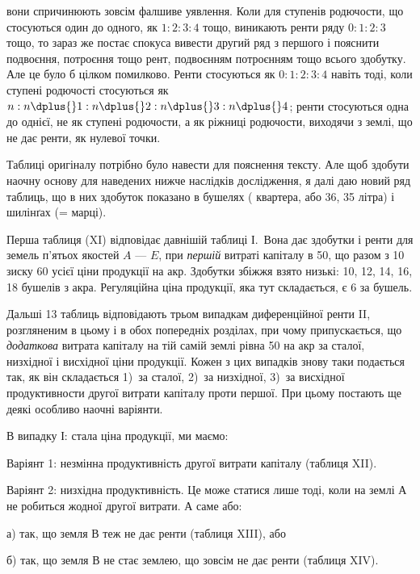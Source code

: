 \parcont{}  %
вони спричинюють зовсім фалшиве уявлення. Коли для ступенів родючости, що
стосуються один до одного, як $1: 2 : 3 : 4$ тощо, виникають ренти ряду $0 : 1 : 2 : 3$
тощо, то зараз же постає спокуса вивести другий ряд з першого і пояснити
подвоєння, потроєння тощо рент, подвоєнням потроєнням тощо всього здобутку.
Але це було б цілком помилково. Ренти стосуються як $0 : 1 : 2 : 3 : 4$ навіть
тоді, коли ступені родючості стосуються як $n : n \dplus{} 1 : n \dplus{} 2 : n \dplus{} 3 : n \dplus{} 4$;
ренти стосуються одна до однієї, не як ступені родючости, а як ріжниці родючости,
виходячи з землі, що не дає ренти, як нулевої точки.

Таблиці оригіналу потрібно було навести для пояснення тексту. Але щоб
здобути наочну основу для наведених нижче наслідків дослідження, я далі
даю новий ряд таблиць, що в них здобуток показано в бушелях (  квартера,
або 36, 35 літра) і шилінґах (= марці).

Перша таблиця (XI) відповідає давнішій таблиці І.~Вона дає здобутки
і ренти для земель п’ятьох якостей $A$ — $E$, при \emph{першій} витраті капіталу в 50, що разом з 10 зиску \deq{} 60 усієї ціни продукції на акр. Здобутки
збіжжя взято низькі: 10, 12, 14, 16, 18 бушелів з акра. Регуляційна
ціна продукції, яка тут складається, є 6 за бушель.

Дальші 13 таблиць відповідають трьом випадкам диференційної ренти II,
розгляненим в цьому і в обох попередніх розділах, при чому припускається, що
\emph{додаткова} витрата капіталу на тій самій землі рівна 50 на акр за сталої,
низхідної і висхідної ціни продукції. Кожен з цих випадків знову таки
подається так, як він складається 1)~за сталої, 2)~за низхідної, 3)~за висхідної
продуктивности другої витрати капіталу проти першої. При цьому постають ще
деякі особливо наочні варіянти.

В випадку І: стала ціна продукції, ми маємо:

Варіянт 1: незмінна продуктивність другої витрати капіталу (таблиця XII).

Варіянт 2: низхідна продуктивність. Це може статися лише тоді, коли на землі
А не робиться жодної другої витрати. А саме або:

а) так, що земля $В$ теж не дає ренти (таблиця XIII), або

б) так, що земля $В$ не стає землею, що зовсім не дає ренти (таблиця XIV).

